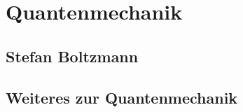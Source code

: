 \documentclass[german]{latex4ei/latex4ei_sheet}
\begin{document}
\section{Quantenmechanik}
\subsection{Stefan Boltzmann}
\subsection{Weiteres zur Quantenmechanik}

\end{document}
